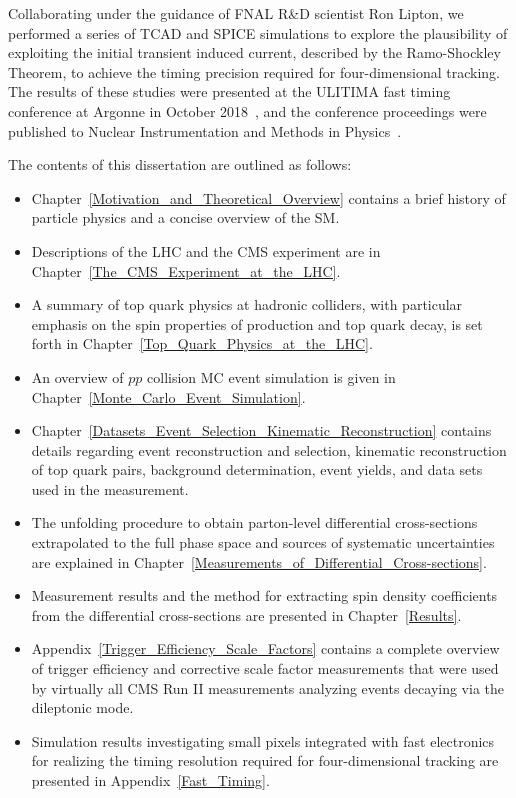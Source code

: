 Collaborating under the guidance of FNAL R\&D scientist Ron Lipton, we performed a series of TCAD and SPICE simulations to explore the plausibility of exploiting the initial transient induced current, described by the Ramo-Shockley Theorem, to achieve the timing precision required for four-dimensional tracking.
The results of these studies were presented at the ULITIMA fast timing conference at Argonne in October 2018~\cite{ULITIMA2018}, and the conference proceedings were published to Nuclear Instrumentation and Methods in Physics~\cite{LIPTON2019162423}.

The contents of this dissertation are outlined as follows:
\begin{itemize}
    \item Chapter~\ref{Motivation_and_Theoretical_Overview} contains a brief history of particle physics and a concise overview of the SM.
    \item Descriptions of the LHC and the CMS experiment are in Chapter~\ref{The_CMS_Experiment_at_the_LHC}.
    \item A summary of top quark physics at hadronic colliders, with particular emphasis on the spin properties of \ttbar production and top quark decay, is set forth in Chapter~\ref{Top_Quark_Physics_at_the_LHC}. 
    \item An overview of $pp$ collision MC event simulation is given in Chapter~\ref{Monte_Carlo_Event_Simulation}.
    \item Chapter~\ref{Datasets_Event_Selection_Kinematic_Reconstruction} contains details regarding event reconstruction and selection, kinematic reconstruction of top quark pairs, background determination, event yields, and data sets used in the measurement.
    \item The unfolding procedure to obtain parton-level differential cross-sections extrapolated to the full phase space and sources of systematic uncertainties are explained in Chapter~\ref{Measurements_of_Differential_Cross-sections}.
    \item Measurement results and the method for extracting spin density coefficients from the differential cross-sections are presented in Chapter~\ref{Results}.
    \item Appendix~\ref{Trigger_Efficiency_Scale_Factors} contains a complete overview of trigger efficiency and corrective scale factor measurements that were used by virtually all CMS Run II measurements analyzing \ttbar events decaying via the dileptonic mode.
    \item Simulation results investigating small pixels integrated with fast electronics for realizing the timing resolution required for four-dimensional tracking are presented in Appendix~\ref{Fast_Timing}.
\end{itemize}